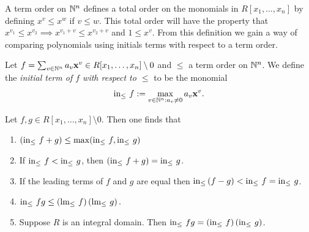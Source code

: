 A term order on $\mathbb{N}^n$ defines a total order on the monomials in 
$R[x_1,\dots,x_n]$ by defining $x^v\leq x^w$ if $v\leq w$. This total order will have the property that $x^{v_1} \leq x^{v_2}\implies x^{v_1+v}\leq x^{v_2+v}$ and $1 \leq x^v$. From this definition we gain a way of comparing polynomials using initials terms with respect to a term order. 
\begin{definition}
    Let $f=\sum_{v\in\mathbb{N}^n} a_v\mathbf{x}^v\in R[x_1,\dots,x_n]\setminus 0$ and $\leq$ a term order on $\mathbb{N}^n$. We define the \textit{initial term of $f$ with respect to $\leq$} to be the monomial
    $$\mathrm{in}_\leq\ f := \max_{v\in \mathbb{N}^n : a_v \neq 0} a_v\mathbf{x}^v.$$
\end{definition}
\begin{lemma}\label{InitialTermProperties}
    Let $f,g\in R[x_1,\dots,x_n]\setminus 0$. Then one finds that
    \begin{enumerate}
        \item $\left(\mathrm{in}_\leq \ f+g\right) \leq \max(\mathrm{in}_\leq\ f, \mathrm{in}_\leq\ g)$
        \item If $\mathrm{in}_\leq \ f< \mathrm{in}_\leq\ g$, then $\left(\inn\ f + g\right) = \inn\ g$.
        \item If the leading terms of $f$ and $g$ are equal then $\mathrm{in}_\leq  \left(f-g \right) < \mathrm{in}_\leq\ f = \mathrm{in}_\leq\ g$.
        \item $\inn\ fg\leq \left(\text{lm}_\leq\ f\right)\left( \text{lm}_\leq\ g\right).$ 
        \item Suppose $R$ is an integral domain. Then $\mathrm{in}_\leq\ fg = \left(\mathrm{in}_\leq\ f\right)\left(\mathrm{in}_\leq\ g\right)$.
    \end{enumerate}
\end{lemma}
